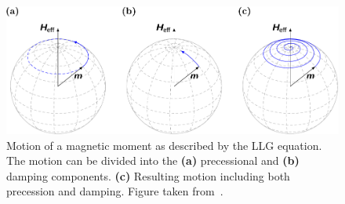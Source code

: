 \documentclass[11pt,a4paper,english]{article}
\begin{document}
\begin{figure}
    \centering
    \includegraphics[width=0.9\columnwidth]{Figures/Introduction/abert2013discrete - Figure 2.2.pdf}
    \caption{Motion of a magnetic moment as described by the LLG equation. The motion can be divided into the \textbf{(a)} precessional and \textbf{(b)} damping components. \textbf{(c)} Resulting motion including both precession and damping. Figure taken from~\cite{abert2013discrete}.}
    \label{fig:LLG_motion_Heff}
\end{figure}
\end{document}
